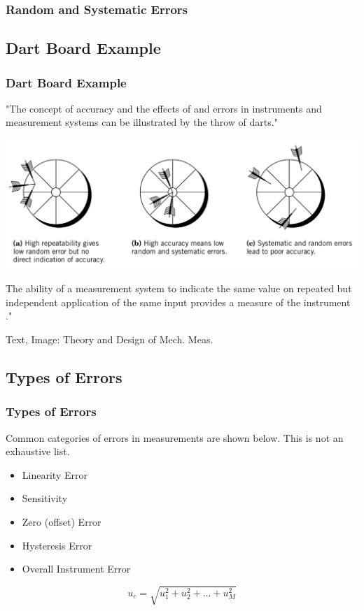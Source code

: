 \documentclass[fleqn]{beamer} %
\newcommand{\sectionIIsubsectionItitle}{Random and Systematic Errors}
\newcommand{\sectionIIsubsectionIItitle}{Dart Board Example}
\newcommand{\sectionIIsubsectionIIItitle}{Types of Errors}
\begin{document}
		    \begin{frame}[label=sectionIIsubsectionI]
				\frametitle{\sectionIIsubsectionItitle}





			\end{frame}	

		\subsection{\sectionIIsubsectionIItitle}\label{sectionIIsubsectionII}

			\begin{frame}
				\frametitle{\sectionIIsubsectionIItitle}
				"The concept of accuracy and the effects of \hspcu and \hspcu errors in instruments
				and measurement systems can be illustrated by the throw of darts."

				\includegraphics[scale=.20]{images/dart_throw.png}

				The ability of a measurement system to indicate the same value on repeated but independent
				application of the same input provides a measure of the instrument \hspcu."

				{\tiny Text, Image: Theory and Design of Mech. Meas.}

			\end{frame}

		\subsection{\sectionIIsubsectionIIItitle}\label{sectionIIsubsectionIII}

			\begin{frame}
				\frametitle{\sectionIIsubsectionIIItitle}

				Common categories of errors in measurements are shown below. This is not an exhaustive list.  

				\begin{itemize}
					
					\item Linearity Error \vspc
					\item Sensitivity \vspc
					\item Zero (offset) Error \vspc
					\item Hysteresis Error \vspc
					\item Overall Instrument Error \vspc
				\end{itemize}

				\[u_c=\sqrt{u_1^2+u_2^2+...+u_M^2}\]

			\end{frame}		
\end{document}
